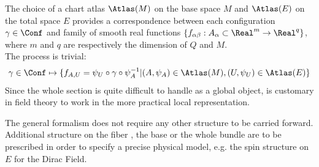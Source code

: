 \documentclass[Main]{subfiles}
\begin{document}
	\vspace{2mm}
	The choice of a chart atlas $\Atlas(M)$ on the base space $M$ and $\Atlas(E)$ on the total space $E$ provides a correspondence between each configuration $\gamma \in \Conf$ and family of smooth real functions $\{f_{\alpha \beta}:A_\alpha \subset \Real^m \rightarrow \Real^q \}$, where $m$ and $q$ are respectively the dimension of $Q$ and $M$.	
	\\
	The process is trivial:
	\begin{equation}\label{Def:LocalChartRepresentation}
		\gamma \in \Conf \mapsto \{f_{A,U}=\psi_U \circ \gamma \circ \psi_A^{-1} \vert (A,\psi_A) \in \Atlas(M), (U,\psi_U)\in \Atlas(E)   \}
	\end{equation}
	Since the whole section is quite difficult to handle  as a global object, is customary in field theory to work in the more practical local representation. 
	
	\vspace{2mm}
	 	The general formalism does not require any other structure to be carried forward.
	 	Additional structure on the fiber , the base or the whole bundle are to be prescribed in order to specify a precise physical model, e.g. the spin structure on $E$ for the Dirac Field.\cite{Benini}
	
\end{document}
